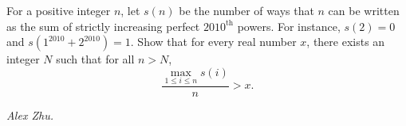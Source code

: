For a positive integer $n$, let $s(n)$ be the number of ways that $n$ can be written as the sum of strictly increasing perfect $2010^{\text{th}}$ powers. For instance, $s(2) = 0$ and $s(1^{2010} + 2^{2010}) = 1$. Show that for every real number $x$, there exists an integer $N$ such that for all $n > N$,
\[\frac{\max_{1 \leq i \leq n} s(i)}{n} > x.\]

\textit{Alex Zhu.}